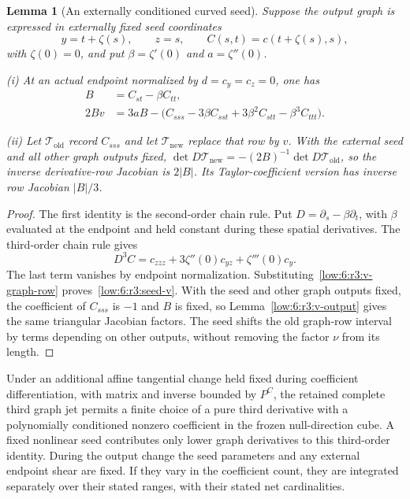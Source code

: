 \documentclass[11pt]{amsart}
\newtheorem{lemma}[theorem]{Lemma}
\theoremstyle{definition}
\theoremstyle{remark}
\numberwithin{equation}{section}
\begin{document}
\begin{lemma}[An externally conditioned curved seed]\label{low:6:r3:v-seed}
Suppose the output graph is expressed in externally fixed seed coordinates
\[
y=t+\zeta(s),\qquad z=s,\qquad C(s,t)=c(t+\zeta(s),s),
\]
with $\zeta(0)=0$, and put $\beta=\zeta'(0)$ and $a=\zeta''(0)$.

\noindent\textup{(i)} At an actual endpoint normalized by $d=c_y=c_z=0$, one has
\begin{align}
B&=C_{st}-\beta C_{tt},\label{low:6:r3:seed-B}\\
 2Bv&=3aB-\bigl(C_{sss}-3\beta C_{sst}+3\beta^2C_{stt}-\beta^3C_{ttt}\bigr).\label{low:6:r3:seed-v}
\end{align}

\noindent\textup{(ii)} Let $\mathcal T_{\mathrm{old}}$ record $C_{sss}$ and let $\mathcal T_{\mathrm{new}}$ replace that row by $v$. With the external seed and all other graph outputs fixed, $\det D\mathcal T_{\mathrm{new}}=-(2B)^{-1}\det D\mathcal T_{\mathrm{old}}$, so the inverse derivative-row Jacobian is $2|B|$. Its Taylor-coefficient version has inverse row Jacobian $|B|/3$.
\end{lemma}
\begin{proof}
The first identity is the second-order chain rule. Put $D=\partial_s-\beta\partial_t$, with $\beta$ evaluated at the endpoint and held constant during these spatial derivatives. The third-order chain rule gives
\[
D^3C=c_{zzz}+3\zeta''(0)c_{yz}+\zeta'''(0)c_y.
\]
The last term vanishes by endpoint normalization. Substituting~\eqref{low:6:r3:v-graph-row} proves~\eqref{low:6:r3:seed-v}. With the seed and other graph outputs fixed, the coefficient of $C_{sss}$ is $-1$ and $B$ is fixed, so Lemma~\ref{low:6:r3:v-output} gives the same triangular Jacobian factors. The seed shifts the old graph-row interval by terms depending on other outputs, without removing the factor $\nu$ from its length.
\end{proof}

Under an additional affine tangential change held fixed during coefficient differentiation, with matrix and inverse bounded by $P^C$, the retained complete third graph jet permits a finite choice of a pure third derivative with a polynomially conditioned nonzero coefficient in the frozen null-direction cube. A fixed nonlinear seed contributes only lower graph derivatives to this third-order identity. During the output change the seed parameters and any external endpoint shear are fixed. If they vary in the coefficient count, they are integrated separately over their stated ranges, with their stated net cardinalities. 
\end{document}
